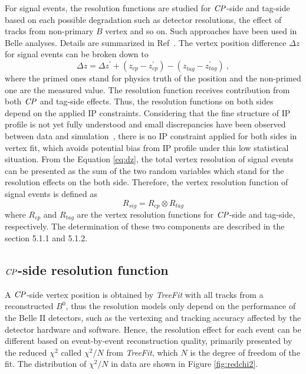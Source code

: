 For signal events, the resolution functions are studied for $\it{CP}$-side and tag-side based on each possible degradation such as detector resolutions, the effect of tracks from non-primary $B$ vertex and so on. Such approaches have been used in Belle analyses. Details are summarized in Ref~\cite{Yusa-note}. The vertex position difference $\Delta z$ for signal events can be broken down to 
\begin{equation}\label{eq:dz}
\Delta z 
=\Delta z^{'} + (z_{cp}^{}- z_{cp}^{'}) - (z_{tag}^{}- z_{tag}^{'}) ~,
\end{equation}
where the primed ones stand for physics truth of the position and the non-primed one are the measured value. The resolution function receives contribution from both $\it{CP}$ and tag-side effects. Thus, the resolution functions on both sides depend on the applied IP constraints. Considering that the fine structure of IP profile is not yet fully understood and small discrepancies have been observed between data and simulation~\cite{jpsiks_ichep}, there is no IP constraint applied for both sides in vertex fit, which avoids potential bias from  IP profile under this low statistical situation. From the Equation \ref{eq:dz}, the total vertex resolution of signal events can be presented as the sum of the two random variables which stand for the resolution effects on the both side. Therefore, the vertex resolution function of signal events is defined as
\begin{equation}\label{eq:Rsig}
R_{sig}=R_{cp}\otimes R_{tag}
\end{equation}
where $R_{cp}$ and $R_{tag}$ are the vertex resolution functions for $\it{CP}$-side and tag-side, respectively. 
The determination of these two components are described in the section 5.1.1 and 5.1.2.
\subsection{$\it{CP}$-side resolution function}
A $\it{CP}$-side vertex position is obtained by \textit{TreeFit} with all tracks from a reconstructed $B^0$, thus the resolution models only depend on the performance of the Belle II detectors, such as the vertexing and tracking accuracy affected by the detector hardware and software. Hence, the resolution effect for each event can be different based on event-by-event reconstruction quality, primarily presented by the reduced $\chi^2$ called $\chi^2/N$ from \textit{TreeFit}, which $N$ is the degree of freedom of the fit. The distribution of $\chi^2/N$ in data are shown in Figure \ref{fig:redchi2}. 

